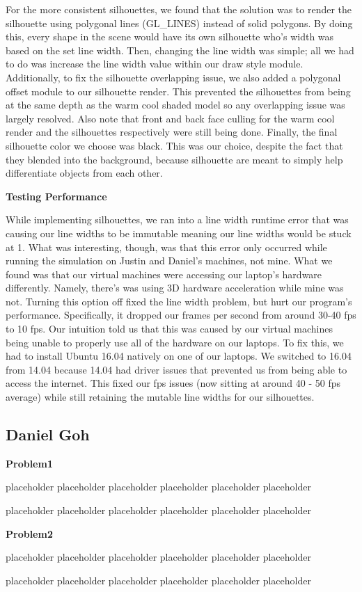 \documentclass[10pt,journal,compsoc,draftclsnofoot]{IEEEtran}
\begin{document}
\begin{flushleft}
For the more consistent silhouettes, we found that the solution was to render the silhouette using polygonal lines (GL\_LINES) instead of solid polygons.
By doing this, every shape in the scene would have its own silhouette who's width was based on the set line width.
Then, changing the line width was simple; all we had to do was increase the line width value within our draw style module.
Additionally, to fix the silhouette overlapping issue, we also added a polygonal offset module to our silhouette render. 
This prevented the silhouettes from being at the same depth as the warm cool shaded model so any overlapping issue was largely resolved.
Also note that front and back face culling for the warm cool render and the silhouettes respectively were still being done.
Finally, the final silhouette color we choose was black.
This was our choice, despite the fact that they blended into the background, because silhouette are meant to simply help differentiate objects from each other.


\textbf{Testing Performance}
\par
\vspace{3mm}
While implementing silhouettes, we ran into a line width runtime error that was causing our line widths to be immutable meaning our line widths would be stuck at 1.
What was interesting, though, was that this error only occurred while running the simulation on Justin and Daniel's machines, not mine.
What we found was that our virtual machines were accessing our laptop's hardware differently.
Namely, there's was using 3D hardware acceleration while mine was not.
Turning this option off fixed the line width problem, but hurt our program's performance.
Specifically, it dropped our frames per second from around 30-40 fps to 10 fps.
Our intuition told us that this was caused by our virtual machines being unable to properly use all of the hardware on our laptops.
To fix this, we had to install Ubuntu 16.04 natively on one of our laptops.
We switched to 16.04 from 14.04 because 14.04 had driver issues that prevented us from being able to access the internet.
This fixed our fps issues (now sitting at around 40 - 50 fps average) while still retaining the mutable line widths for our silhouettes.
\newpage

\subsection{Daniel Goh}
\textbf{Problem1}
\par
placeholder placeholder placeholder placeholder placeholder placeholder
\par
placeholder placeholder placeholder placeholder placeholder placeholder

\vspace{3mm}

\textbf{Problem2}
\par
placeholder placeholder placeholder placeholder placeholder placeholder
\par
placeholder placeholder placeholder placeholder placeholder placeholder

\newpage

\null
\vfill

\end{flushleft}
\end{document}
